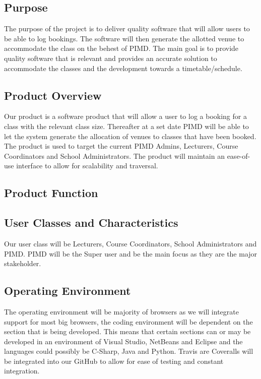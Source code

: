 \documentclass[12pt]{article}
\begin{document}
\subsection{Purpose}
The purpose of the project is to deliver quality software that will allow users to be able to log bookings. The software will then generate the allotted venue to accommodate the class on the behest of PIMD. The main goal is to provide quality software that is relevant and provides an accurate solution to accommodate the classes and the development towards a timetable/schedule.

\subsection{Product Overview}
Our product is a software product that will allow a user to log a booking for a class with the relevant class size. Thereafter at a set date PIMD will be able to let the system generate the allocation of venues to classes that have been booked. The product is used to target the current PIMD Admins, Lecturers, Course Coordinators and School Administrators. The product will maintain an ease-of-use interface to allow for scalability and traversal.

\subsection{Product Function}

\subsection{User Classes and Characteristics}
Our user class will be Lecturers, Course Coordinators, School Administrators and PIMD. PIMD will be the Super user and be the main focus as they are the major stakeholder.

\subsection{Operating Environment}
The operating environment will be majority of browsers as we will integrate support for most big browsers, the coding environment will be dependent on the section that is being developed. This means that certain sections can or may be developed in an environment of Visual Studio, NetBeans and Eclipse and the languages could possibly be C-Sharp, Java and Python. Travis are Coveralls will be integrated into our GitHub to allow for ease of testing and constant integration.
\end{document}
